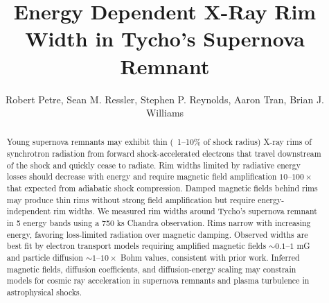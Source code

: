 \documentclass[manuscript]{aastex}  %
\newcommand{\abt}{\mathord{\sim}} %
\begin{document}
\title{Energy Dependent X-Ray Rim Width in Tycho's Supernova Remnant}

\author{
Robert Petre,
Sean M. Ressler,
Stephen P. Reynolds,
Aaron Tran,
Brian J. Williams
}


\begin{abstract}
Young supernova remnants may exhibit thin (~1--10\% of shock radius) X-ray rims
of synchrotron radiation from forward shock-accelerated electrons that travel
downstream of the shock and quickly cease to radiate. Rim widths limited by
radiative energy losses should decrease with energy and require magnetic field
amplification $10$--$100\times$ that expected from adiabatic shock compression.
Damped magnetic fields behind rims may produce thin rims without strong field
amplification but require energy-independent rim widths. We measured rim widths
around Tycho's supernova remnant in 5 energy bands using a 750 ks Chandra
observation. Rims narrow with increasing energy, favoring loss-limited
radiation over magnetic damping. Observed widths are best fit by electron
transport models requiring amplified magnetic fields $\abt0.1$--$1$ mG and
particle diffusion $\abt1$--$10\times$ Bohm values, consistent with prior work.
Inferred magnetic fields, diffusion coefficients, and diffusion-energy scaling
may constrain models for cosmic ray acceleration in supernova remnants and
plasma turbulence in astrophysical shocks.
\end{abstract}


\end{document}
